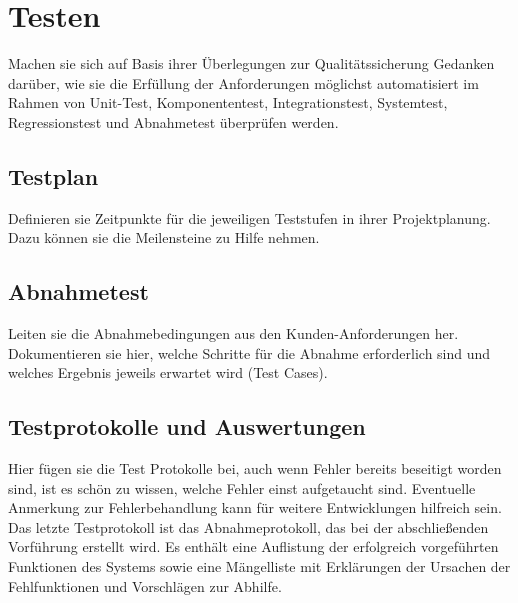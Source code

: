 \chapter{Testen}

Machen sie sich auf Basis ihrer Überlegungen zur Qualitätssicherung
Gedanken darüber, wie sie die Erfüllung der Anforderungen möglichst
automatisiert im Rahmen von Unit-Test, Komponententest,
Integrationstest, Systemtest, Regressionstest und Abnahmetest überprüfen
werden.

\section{Testplan}

Definieren sie Zeitpunkte für die jeweiligen Teststufen in ihrer
Projektplanung. Dazu können sie die Meilensteine zu Hilfe nehmen.

\section{Abnahmetest}

Leiten sie die Abnahmebedingungen aus den Kunden-Anforderungen her.
Dokumentieren sie hier, welche Schritte für die Abnahme erforderlich
sind und welches Ergebnis jeweils erwartet wird (Test Cases).

\section{Testprotokolle und Auswertungen}

Hier fügen sie die Test Protokolle bei, auch wenn Fehler bereits
beseitigt worden sind, ist es schön zu wissen, welche Fehler einst
aufgetaucht sind. Eventuelle Anmerkung zur Fehlerbehandlung kann für
weitere Entwicklungen hilfreich sein.
Das letzte Testprotokoll ist das Abnahmeprotokoll, das bei der
abschließenden Vorführung erstellt wird. Es enthält eine Auflistung der
erfolgreich vorgeführten Funktionen des Systems sowie eine Mängelliste
mit Erklärungen der Ursachen der Fehlfunktionen und Vorschlägen zur
Abhilfe.

